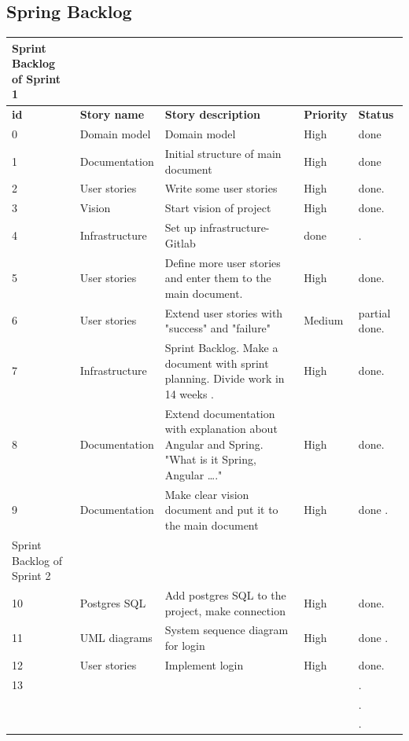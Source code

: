 \documentclass{scrartcl}
\begin{document}
\subsection{Spring Backlog}


\begin{table}[H]
\begin{center}
\begin{tabular}{| p{2.5cm}| p{4cm} | p{5cm} |p{2.5cm} | p{4cm}|}
   Sprint Backlog of Sprint 1\\ \hline
    

          \textbf{id}  &  \textbf{Story name} &  \textbf{Story description} &  \textbf{Priority}  & \textbf{Status}\\ \hline
         0 & Domain model & Domain model & High & done \\ \hline
        1 & Documentation  & Initial structure of main document & High & done \\ \hline
        
           2 &  User stories  & Write some user stories  & High & done. \\ \hline
           3 &  Vision &  Start vision of project & High  & done. \\ \hline
            4 & Infrastructure & Set up infrastructure- Gitlab & done & . \\ \hline
             5 &  User stories & Define more user stories and enter them to the main document. & High & done. \\ \hline
              6 & User stories & Extend user stories with "success" and "failure" & Medium & partial done. \\ \hline
               7 & Infrastructure & Sprint Backlog. Make a document with sprint planning. Divide work in 14 weeks .  & High &  done. \\ \hline
                8 & Documentation & Extend documentation with explanation about Angular and Spring. "What is it Spring, Angular …." & High & done. \\ \hline
                9 & Documentation & Make clear vision document and put it to the main document & High & done . \\ \hline
               
                Sprint Backlog of Sprint 2 \\
                  10 & Postgres SQL & Add postgres SQL to the project, make connection & High & done. \\ \hline
                    11& UML diagrams & System sequence diagram for login & High & done . \\ \hline
                    12 &  User stories &  Implement login & High & done. \\ \hline
                     13 &  &  &  & . \\ \hline
                       &  &  &  & . \\ \hline
                        &  &  &  & . \\ \hline
                    

\end{tabular}
\end{center}
\end{table}
\end{document}
